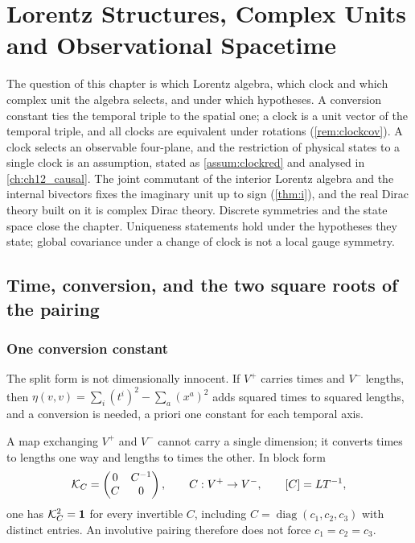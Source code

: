 \chapter{Lorentz Structures, Complex Units and Observational Spacetime}
\label{ch:ch02_lorentz}

The question of this chapter is which Lorentz algebra, which clock and which complex unit the algebra selects, and under which
hypotheses. A conversion constant ties the temporal triple to the spatial one; a clock is a unit vector of the temporal triple, and all
clocks are equivalent under rotations (\cref{rem:clockcov}). A clock selects an observable four-plane, and the restriction of physical
states to a single clock is an assumption, stated as \cref{assum:clockred} and analysed in \cref{ch:ch12_causal}. The joint commutant of
the interior Lorentz algebra and the internal bivectors fixes the imaginary unit up to sign (\cref{thm:i}), and the real Dirac theory
built on it is complex Dirac theory. Discrete symmetries and the state space close the chapter. Uniqueness statements hold under the
hypotheses they state; global covariance under a change of clock is not a local gauge symmetry.




\section{Time, conversion, and the two square roots of the pairing}
\label{sec:clock}

\subsection{One conversion constant}

The split form is not dimensionally innocent. If $V^+$ carries times and $V^-$ lengths, then
$\eta(v,v)=\sum_i(t^i)^2-\sum_a(x^a)^2$ adds squared times to squared lengths, and a conversion is needed, a priori one
constant for each temporal axis.

\begin{proposition}
\label{prop:KC}
A map exchanging $V^+$ and $V^-$ cannot carry a single dimension; it converts times to lengths one way and lengths to times
the other. In block form
\begin{equation}
\label{eq:KC}
\mathcal K_C=\begin{pmatrix}0&C^{-1}\\ C&0\end{pmatrix},\qquad C:V^+\to V^-,\qquad [C]=LT^{-1},
\end{equation}
one has $\mathcal K_C^2=\mathbf 1$ for every invertible $C$, including $C=\operatorname{diag}(c_1,c_2,c_3)$ with distinct entries. An
involutive pairing therefore does not force $c_1=c_2=c_3$.
\end{proposition}

